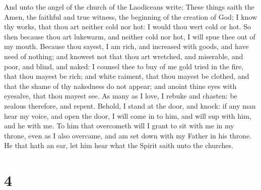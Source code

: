  And unto the angel of the church of the Laodiceans write;
These things saith the Amen, the faithful and true witness, the
beginning of the creation of God;  I know thy works, that
thou art neither cold nor hot: I would thou wert cold or hot.
 So then because thou art lukewarm, and neither cold nor
hot, I will spue thee out of my mouth.  Because thou
sayest, I am rich, and increased with goods, and have need of nothing;
and knowest not that thou art wretched, and miserable, and poor, and
blind, and naked:  I counsel thee to buy of me gold tried
in the fire, that thou mayest be rich; and white raiment, that thou
mayest be clothed, and that the shame of thy nakedness do not appear;
and anoint thine eyes with eyesalve, that thou mayest see. 
As many as I love, I rebuke and chasten: be zealous therefore, and
repent.  Behold, I stand at the door, and knock: if any man
hear my voice, and open the door, I will come in to him, and will sup
with him, and he with me.  To him that overcometh will I
grant to sit with me in my throne, even as I also overcame, and am set
down with my Father in his throne.  He that hath an ear,
let him hear what the Spirit saith unto the churches.

\hypertarget{section-3}{%
\section{4}\label{section-3}}

